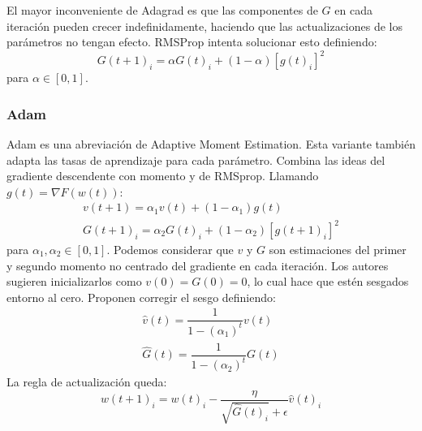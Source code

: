 El mayor inconveniente de Adagrad es que las componentes de $G$ en cada iteración pueden crecer indefinidamente, haciendo que las actualizaciones de los parámetros no tengan efecto. RMSProp intenta solucionar esto definiendo:
$$ G(t+1)_{i} = \alpha G(t)_{i} + (1-\alpha) [ g(t)_{i} ]^2 $$ 
para $\alpha \in [0,1]$.

\subsubsection{Adam}
Adam es una abreviación de Adaptive Moment Estimation. Esta variante también adapta las tasas de aprendizaje para cada parámetro. Combina las ideas del gradiente descendente con momento y de RMSprop. Llamando $g(t) = \nabla F(w(t))$:
\begin{gather*}
	v(t+1) = \alpha_1 v(t) + (1-\alpha_1) g(t)\\
	G(t+1)_{i} = \alpha_2 G(t)_{i} + (1-\alpha_2) [ g(t+1)_{i} ]^2
\end{gather*}
para $\alpha_1, \alpha_2 \in [0,1]$. Podemos considerar que $v$ y $G$ son estimaciones del primer y segundo momento no centrado del gradiente en cada iteración. Los autores sugieren inicializarlos como $v(0) = G(0) = 0$, lo cual hace que estén sesgados entorno al cero. Proponen corregir el sesgo definiendo:
\begin{gather*}
	\hat{v}(t) =\dfrac{1}{1-(\alpha_1)^t} v(t)\\
	\hat{G}(t) = \dfrac{1}{1-(\alpha_2)^t} G(t)
\end{gather*}
La regla de actualización queda:
$$ w(t+1)_{i} = w(t)_{i} - \dfrac{\eta}{\sqrt{\hat{G}(t)_{i}}  + \epsilon} \hat{v}(t)_i $$

